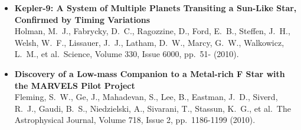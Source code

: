\documentclass[12pt,letterpaper,sans]{moderncv} %
\begin{document}
\begin{itemize}
 \item \textbf{ Kepler-9: A System of Multiple Planets Transiting a 
Sun-Like Star, Confirmed by Timing Variations } \\ Holman, M.~J., Fabrycky, 
D.~C., Ragozzine, D., Ford, E.~B., Steffen, J.~H., Welsh, W.~F., Lissauer, 
J.~J., Latham, D.~W., Marcy, G.~W., Walkowicz, L.~M., et al.\ Science, 
Volume 330, Issue 6000, pp.~51- (2010).\ \\ 

 \item \textbf{ Discovery of a Low-mass Companion to a Metal-rich F Star 
with the MARVELS Pilot Project } \\ Fleming, S.~W., Ge, J., Mahadevan, S., 
Lee, B., Eastman, J.~D., Siverd, R.~J., Gaudi, B.~S., Niedzielski, A., 
Sivarani, T., Stassun, K.~G., et al.\ The Astrophysical Journal, Volume 
718, Issue 2, pp.~1186-1199 (2010).\ \\ 


\end{itemize}

\newpage
\end{document}
